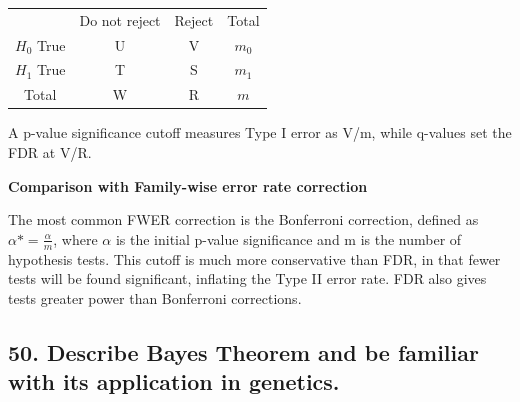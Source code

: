 \documentclass{tufte-handout}
\theoremstyle{noparens}
\begin{document}
\begin{tabular}{c cc|c}
	  & Do not reject & Reject & Total \\ 
 $H_0$ True & U & V & $m_0$ \\ 
 $H_1$ True & T & S & $m_1$ \\ 
	\hline Total & W & R & $m$ \\  
\end{tabular} 

A p-value significance cutoff measures Type I error as V/m, while q-values set the FDR at V/R.

\textbf{Comparison with Family-wise error rate correction}

The most common FWER correction is the Bonferroni correction, defined as $\alpha* = \frac{\alpha}{m}$, where $\alpha$ is the initial p-value significance and m is the number of hypothesis tests. This cutoff is much more conservative than FDR, in that fewer tests will be found significant, inflating the Type II error rate. FDR also gives tests greater power than Bonferroni corrections.


\newpage
\subsection{50. Describe Bayes Theorem and be familiar with its application in genetics.}
\end{document}
